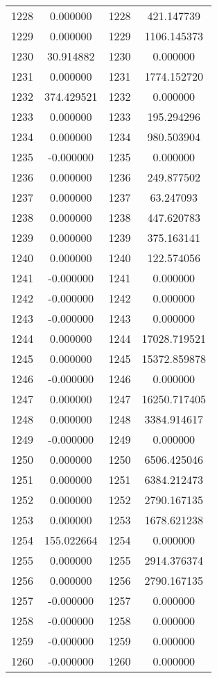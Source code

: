 \documentclass[12pt]{article}
\begin{document}
\begin{longtable}{@{}cccc@{}}
1228 & 0.000000 & 1228 & 421.147739 \\
1229 & 0.000000 & 1229 & 1106.145373 \\
1230 & 30.914882 & 1230 & 0.000000 \\
1231 & 0.000000 & 1231 & 1774.152720 \\
1232 & 374.429521 & 1232 & 0.000000 \\
1233 & 0.000000 & 1233 & 195.294296 \\
1234 & 0.000000 & 1234 & 980.503904 \\
1235 & -0.000000 & 1235 & 0.000000 \\
1236 & 0.000000 & 1236 & 249.877502 \\
1237 & 0.000000 & 1237 & 63.247093 \\
1238 & 0.000000 & 1238 & 447.620783 \\
1239 & 0.000000 & 1239 & 375.163141 \\
1240 & 0.000000 & 1240 & 122.574056 \\
1241 & -0.000000 & 1241 & 0.000000 \\
1242 & -0.000000 & 1242 & 0.000000 \\
1243 & -0.000000 & 1243 & 0.000000 \\
1244 & 0.000000 & 1244 & 17028.719521 \\
1245 & 0.000000 & 1245 & 15372.859878 \\
1246 & -0.000000 & 1246 & 0.000000 \\
1247 & 0.000000 & 1247 & 16250.717405 \\
1248 & 0.000000 & 1248 & 3384.914617 \\
1249 & -0.000000 & 1249 & 0.000000 \\
1250 & 0.000000 & 1250 & 6506.425046 \\
1251 & 0.000000 & 1251 & 6384.212473 \\
1252 & 0.000000 & 1252 & 2790.167135 \\
1253 & 0.000000 & 1253 & 1678.621238 \\
1254 & 155.022664 & 1254 & 0.000000 \\
1255 & 0.000000 & 1255 & 2914.376374 \\
1256 & 0.000000 & 1256 & 2790.167135 \\
1257 & -0.000000 & 1257 & 0.000000 \\
1258 & -0.000000 & 1258 & 0.000000 \\
1259 & -0.000000 & 1259 & 0.000000 \\
1260 & -0.000000 & 1260 & 0.000000 \\

\end{longtable}
\end{document}
